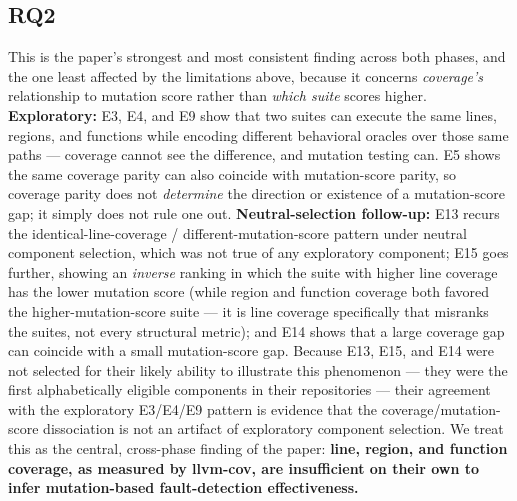 \documentclass[10pt,conference]{IEEEtran}
\begin{document}
\subsection{RQ2}
This is the paper's strongest and most consistent finding across both phases, and the one least affected by the limitations above, because it concerns \emph{coverage's} relationship to mutation score rather than \emph{which suite} scores higher. \textbf{Exploratory:} E3, E4, and E9 show that two suites can execute the same lines, regions, and functions while encoding different behavioral oracles over those same paths — coverage cannot see the difference, and mutation testing can. E5 shows the same coverage parity can also coincide with mutation-score parity, so coverage parity does not \emph{determine} the direction or existence of a mutation-score gap; it simply does not rule one out. \textbf{Neutral-selection follow-up:} E13 recurs the identical-line-coverage / different-mutation-score pattern under neutral component selection, which was not true of any exploratory component; E15 goes further, showing an \emph{inverse} ranking in which the suite with higher line coverage has the lower mutation score (while region and function coverage both favored the higher-mutation-score suite — it is line coverage specifically that misranks the suites, not every structural metric); and E14 shows that a large coverage gap can coincide with a small mutation-score gap. Because E13, E15, and E14 were not selected for their likely ability to illustrate this phenomenon — they were the first alphabetically eligible components in their repositories — their agreement with the exploratory E3/E4/E9 pattern is evidence that the coverage/mutation-score dissociation is not an artifact of exploratory component selection. We treat this as the central, cross-phase finding of the paper: \textbf{line, region, and function coverage, as measured by llvm-cov, are insufficient on their own to infer mutation-based fault-detection effectiveness.}
\end{document}
